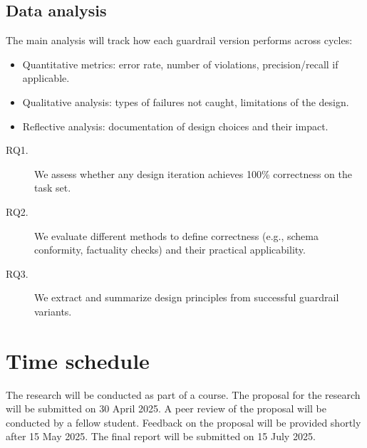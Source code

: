 \documentclass[a4paper,doc,natbib]{apa6}
\begin{document}
    \subsection{Data analysis}

    The main analysis will track how each guardrail version performs across cycles:
    \begin{itemize}
        \item Quantitative metrics: error rate, number of violations, precision/recall if applicable.
        \item Qualitative analysis: types of failures not caught, limitations of the design.
        \item Reflective analysis: documentation of design choices and their impact.
    \end{itemize}

    \begin{description}
        \item[RQ1.] We assess whether any design iteration achieves 100\% correctness on the task set.
        \item[RQ2.] We evaluate different methods to define correctness (e.g., schema conformity, factuality checks) and their practical applicability.
        \item[RQ3.] We extract and summarize design principles from successful guardrail variants.
    \end{description}

    \section{Time schedule}

    The research will be conducted as part of a course. The proposal for the research will be submitted on 30 April 2025. A peer review of the proposal will be conducted by a fellow student. Feedback on the proposal will be provided shortly after 15 May 2025. The final report will be submitted on 15 July 2025.

    
\end{document}
